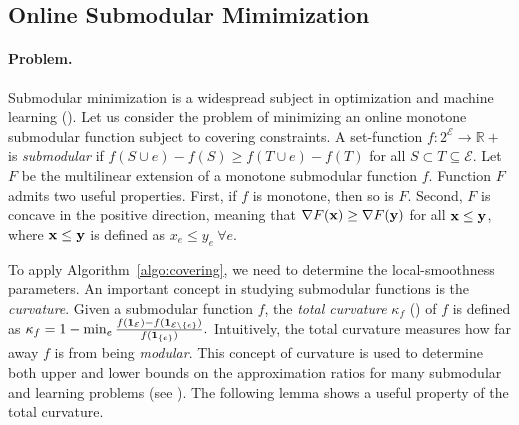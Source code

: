 
\subsection{Online Submodular Mimimization}	\label{apix:sub-min}

\paragraph{Problem.} Submodular minimization is a widespread subject in optimization and machine learning (\cite{IwataFleischer01:A-combinatorial-strongly,Bachothers13:Learning-with,Bach16:Submodular-functions:,BalkanskiSinger:2020}). Let us consider the problem of minimizing an online monotone submodular function subject to covering constraints.
A set-function $f: 2^{\mathcal{E}} \rightarrow \mathbb{R}+$ is \emph{submodular} if
$f(S \cup e) - f(S) \geq f(T \cup e) - f(T)$ for all $S \subset T \subseteq \mathcal{E}$.
Let $F$ be the multilinear extension of a monotone submodular function $f$. Function $F$
admits two useful properties. First, if $f$ is monotone, then so is $F$. Second, $F$ is concave in
the positive direction, meaning that $\nabla F(\mathbf{x}) \geq \nabla F(\mathbf{y})$ for all $\mathbf{x} \leq \mathbf{y}$, where $\mathbf{x} \leq \mathbf{y}$ is defined as $x_{e} \leq y_{e} ~\forall e$.

To apply Algorithm~\ref{algo:covering}, we need to determine the local-smoothness parameters.
An important concept in studying submodular functions is the \emph{curvature}. Given a submodular
function $f$, the \emph{total curvature} $\kappa_{f}$ (\cite{ConfortiCornuejols84:Submodular-set-functions}) of $f$ is defined as
$
\kappa_{f} = 1 - \min_{e} \frac{f(\mathbf{1}_{\mathcal{E}}) - f(\mathbf{1}_{\mathcal{E} \setminus \{e\}})}{f(\mathbf{1}_{\{e\}})}.
$
Intuitively, the total curvature measures how far away $f$ is from being \emph{modular}. This concept of
curvature is used to determine both upper and lower bounds on the approximation ratios
for many submodular and learning problems (see \cite{ConfortiCornuejols84:Submodular-set-functions,GoemansHarvey09:Approximating-submodular,BalcanHarvey12:Learning-Submodular,Vondrak10:Submodularity-and-Curvature:,IyerJegelka13:Curvature-and-optimal,SviridenkoVondrak17:Optimal-approximation}).
The following lemma shows a useful property of the total curvature.

